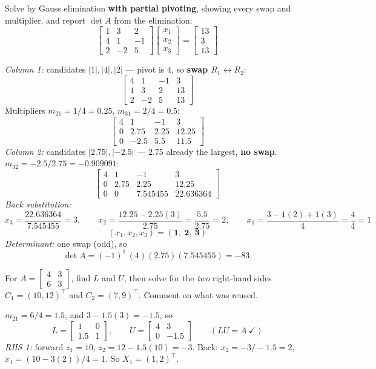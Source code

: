 \begin{probbox}
 Solve by Gauss elimination \textbf{with partial pivoting}, showing every swap and multiplier, and report $\det A$ from the elimination:
\[
\begin{bmatrix}1&3&2\\4&1&-1\\2&-2&5\end{bmatrix}
\begin{bmatrix}x_1\\x_2\\x_3\end{bmatrix}=
\begin{bmatrix}13\\3\\13\end{bmatrix}
\]

\ans \emph{Column 1:} candidates $|1|, |4|, |2|$ --- pivot is $4$, so \textbf{swap $R_1\leftrightarrow R_2$}:
\[
\begin{bmatrix}4&1&-1&3\\1&3&2&13\\2&-2&5&13\end{bmatrix}
\]
Multipliers $m_{21} = 1/4 = 0.25$, $m_{31} = 2/4 = 0.5$:
\[
\begin{bmatrix}4&1&-1&3\\0&2.75&2.25&12.25\\0&-2.5&5.5&11.5\end{bmatrix}
\]
\emph{Column 2:} candidates $|2.75|, |-2.5|$ --- $2.75$ already the largest, \textbf{no swap}. $m_{32} = -2.5/2.75 = -0.909091$:
\[
\begin{bmatrix}4&1&-1&3\\0&2.75&2.25&12.25\\0&0&7.545455&22.636364\end{bmatrix}
\]
\emph{Back substitution:}
\[
x_3 = \frac{22.636364}{7.545455} = 3, \qquad
x_2 = \frac{12.25-2.25(3)}{2.75} = \frac{5.5}{2.75} = 2, \qquad
x_1 = \frac{3-1(2)+1(3)}{4} = \frac{4}{4} = 1
\]
\[
(x_1,x_2,x_3) = (\mathbf{1},\ \mathbf{2},\ \mathbf{3})
\]
\emph{Determinant:} one swap (odd), so
\[
\det A = (-1)^1\,(4)(2.75)(7.545455) = -83 .
\]

 For $A = \begin{bmatrix}4&3\\6&3\end{bmatrix}$, find $L$ and $U$, then solve for the \emph{two} right-hand sides $C_1 = (10,12)^\top$ and $C_2 = (7,9)^\top$. Comment on what was reused.

\ans $m_{21} = 6/4 = 1.5$, and $3 - 1.5(3) = -1.5$, so
\[
L = \begin{bmatrix}1&0\\1.5&1\end{bmatrix},\qquad
U = \begin{bmatrix}4&3\\0&-1.5\end{bmatrix}
\qquad (LU = A\ \checkmark)
\]
\emph{RHS 1:} forward $z_1 = 10$, $z_2 = 12-1.5(10) = -3$. Back: $x_2 = -3/-1.5 = 2$, $x_1 = (10-3(2))/4 = 1$. So $X_1 = (1,2)^\top$.


\end{probbox}
